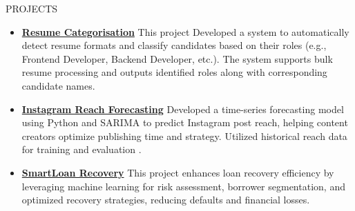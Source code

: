 \documentclass{resume}
\begin{document}
\vspace{1em}
\begin{rSection}{PROJECTS}
    \begin{itemize}
        \item \textbf{\href{https://github.com}{Resume Categorisation}} {This project Developed a system to automatically detect resume formats and classify candidates based on their roles (e.g., Frontend Developer, Backend Developer, etc.). The system supports bulk resume processing and outputs identified roles along with corresponding candidate names.}
        \vspace{-0.2em}
        \item \textbf{\href{https://github.com/trishaamandal/Instareach}{Instagram Reach Forecasting}} {Developed a time-series forecasting model using Python and SARIMA to predict Instagram post reach, helping content creators optimize publishing time and strategy. Utilized historical reach data for training and evaluation .}
        \vspace{-0.2em}
        \item \textbf{\href{https://github.com}{SmartLoan Recovery}} {This project enhances loan recovery efficiency by leveraging machine learning for risk assessment, borrower segmentation, and optimized recovery strategies, reducing defaults and financial losses.}
        \vspace{-0.2em}
    \end{itemize}
\end{rSection}
\end{document}
